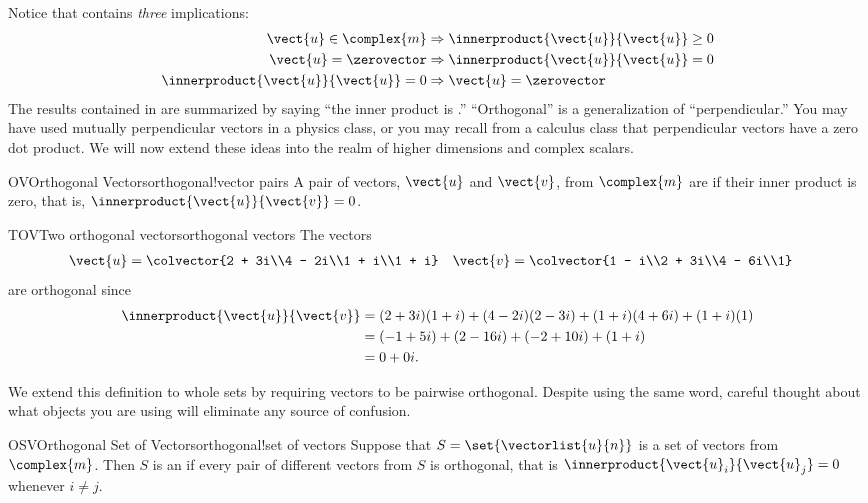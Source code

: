 %
Notice that  contains {\em three} implications:
\begin{align*}
\vect{u}\in\complex{m}&\Rightarrow\innerproduct{\vect{u}}{\vect{u}}\geq 0\\
\vect{u}=\zerovector&\Rightarrow\innerproduct{\vect{u}}{\vect{u}}=0\\
\innerproduct{\vect{u}}{\vect{u}}=0&\Rightarrow\vect{u}=\zerovector
\end{align*}
%
The results contained in  are summarized by saying ``the inner product is .''
%
%
``Orthogonal'' is a generalization of ``perpendicular.''  You may have used mutually perpendicular vectors in a physics class, or you may recall from a calculus class that perpendicular vectors have a zero dot product.  We will now extend these ideas into the realm of higher dimensions and complex scalars.
%
%
\begin{definition}{OV}{Orthogonal Vectors}{orthogonal!vector pairs}
A pair of vectors, $\vect{u}$ and $\vect{v}$, from $\complex{m}$ are  if their inner product is zero, that is, $\innerproduct{\vect{u}}{\vect{v}}=0$.
\end{definition}
%
%
\begin{example}{TOV}{Two orthogonal vectors}{orthogonal vectors}
The vectors
%
\begin{align*}
\vect{u}&=\colvector{2 + 3i\\4 - 2i\\1 + i\\1 + i}
&
\vect{v}&=\colvector{1 - i\\2 + 3i\\4 - 6i\\1}
\end{align*}
%
are orthogonal since
%
\begin{align*}
\innerproduct{\vect{u}}{\vect{v}}
&=(2+3i)(1+i)+(4-2i)(2-3i)+(1+i)(4+6i)+(1+i)(1)\\
&=(-1+5i)+(2-16i)+(-2+10i)+(1+i)\\
&=0+0i.
\end{align*}
%
\end{example}
%
We extend this definition to whole sets by requiring vectors to be pairwise orthogonal.  Despite using the same word, careful thought about what objects you are using will eliminate any source of confusion.
%
\begin{definition}{OSV}{Orthogonal Set of Vectors}{orthogonal!set of vectors}
Suppose that $S=\set{\vectorlist{u}{n}}$ is a set of vectors from $\complex{m}$.  Then $S$ is an  if every pair of different vectors from $S$ is orthogonal, that is $\innerproduct{\vect{u}_i}{\vect{u}_j}=0$ whenever $i\neq j$.
\end{definition}

